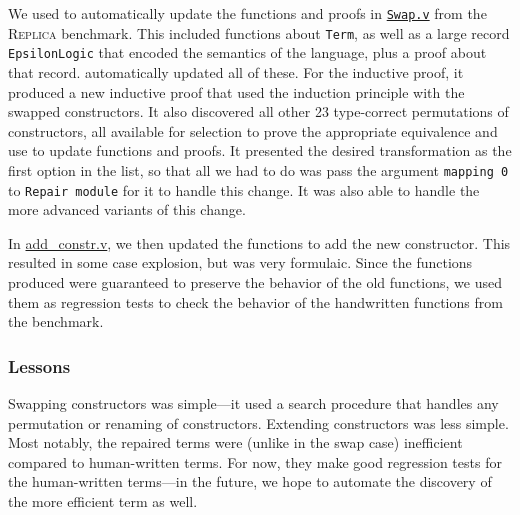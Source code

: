 We used \toolname to automatically update the functions and proofs in \href{https://github.com/uwplse/pumpkin-pi/blob/master/plugin/coq/Swap.v}{\lstinline{Swap.v}} from the \textsc{Replica} benchmark.
This included functions about \lstinline{Term}, as well as a large record \lstinline{EpsilonLogic} that encoded the semantics of the language,
plus a proof about that record.
\toolname automatically updated all of these. For the inductive proof, it produced
a new inductive proof that used the induction principle with the swapped constructors.
It also discovered all other 23 type-correct permutations of constructors, all available for selection to 
prove the appropriate equivalence and use to update functions and proofs.
It presented the desired transformation as the first option in the list, so that all we had to do
was pass the argument \lstinline{mapping 0} to \lstinline{Repair module} for it to handle this change.
It was also able to handle the more advanced variants of this change.

In \href{https://github.com/uwplse/pumpkin-pi/blob/master/plugin/coq/playground/add_constr.v}{add_constr.v},
we then updated the functions to add the new constructor.
This resulted in some case explosion, but was very formulaic.
Since the functions \toolname produced were guaranteed to preserve the behavior of the old functions,
we used them as regression tests to check the behavior of the handwritten functions from the benchmark.

\subsubsection{Lessons}

Swapping constructors was simple---it used a search procedure that handles
any permutation or renaming of constructors.
Extending constructors was less simple.
Most notably, the repaired terms were (unlike in the swap case) inefficient compared to human-written terms.
For now, they make good regression tests for the human-written terms---in the future,
we hope to automate the discovery of the more efficient term as well.

